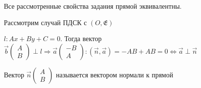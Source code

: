 \begin{corollary}
	Все рассмотренные свойства задания прямой эквивалентны.
\end{corollary}
Рассмотрим случай ПДСК с \((O, \mathfrak{E})\)
\begin{proposition}
	\(l: Ax+By+C = 0\). Тогда вектор \(\vec b\begin{pmatrix}
		A \\ B
	\end{pmatrix}\perp l \Longrightarrow \vec{a}\begin{pmatrix}
	-B \\ A
	\end{pmatrix}: (\vec n, \vec a) = -AB + AB = 0\Longleftrightarrow \vec a\perp \vec n\)
\end{proposition}
\begin{definition}
	Вектор \(\vec n \begin{pmatrix}
		A \\ B
		\end{pmatrix}\) называется вектором нормали к прямой
\end{definition}
